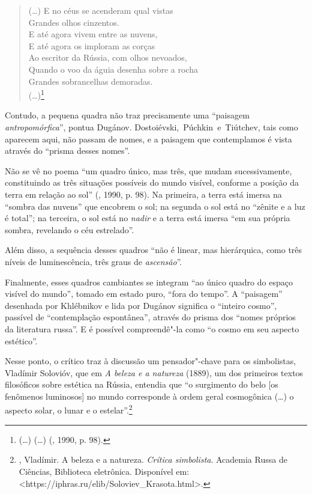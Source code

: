 \begin{verse}
(\ldots{})
E no céus se acenderam qual vistas \\
Grandes olhos cinzentos. \\
E até agora vivem entre as nuvens, \\
E até agora os imploram as corças \\
Ao escritor da Rússia, com olhos nevoados, \\
Quando o voo da águia desenha sobre a \qb{}rocha \\
Grandes sobrancelhas demoradas. \\
(\ldots{})\footnote{(\ldots{}) {} (\ldots{}) (, 1990, p.
  98).}
\end{verse}

Contudo, a pequena quadra não traz precisamente uma ``paisagem
\emph{antropomórfica}'', pontua Dugánov. Dostoiévski,~Púchkin~e~Tiútchev, tais como aparecem aqui, não passam de nomes, e a paisagem que
contemplamos é vista através do ``prisma desses nomes''.

Não se vê no poema ``um quadro único, mas três, que
mudam sucessivamente, constituindo as três situações possíveis do mundo
visível, conforme a posição da terra em relação ao sol'' (, 1990, p. 98). Na primeira, a
terra está imersa na ``sombra das nuvens'' que encobrem o sol; na segunda o
sol está no ``zênite e a luz é total''; na terceira, o sol está no \emph{nadir} e a
terra está imersa ``em sua própria sombra, revelando o céu estrelado''.

Além disso, a sequência desses quadros ``não é linear, mas
hierárquica, como três níveis de luminescência, três graus de \emph{ascensão}''.

Finalmente, esses quadros cambiantes se integram ``ao único quadro do
espaço visível do mundo'', tomado em estado puro, ``fora do tempo''. A
``paisagem'' desenhada por Khlébnikov e lida por Dugánov significa o ``inteiro cosmo'', passível de ``contemplação
espontânea'', através do prisma dos ``nomes próprios da literatura russa''.
E é possível compreendê"-la como ``o cosmo em seu aspecto estético''.

Nesse ponto, o crítico traz à discussão um pensador"-chave para os
simbolistas, Vladímir Solovióv, que em \emph{A beleza e a natureza} (1889), um dos primeiros textos filosóficos sobre estética na
Rússia, entendia que ``o surgimento do belo [os fenômenos
luminosos] no mundo corresponde à ordem geral cosmogônica (\ldots{}) o aspecto
solar, o lunar e o estelar''.\footnote{, Vladímir. A beleza e a
  natureza. \emph{Crítica simbolista}. Academia Russa de Ciências,
  Biblioteca eletrônica. Disponível em: \textless{}https://iphras.ru/elib/Soloviev\_Krasota.html\textgreater{}.} 

